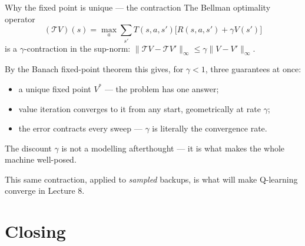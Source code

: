 \documentclass[10pt, aspectratio=169]{beamer}
\begin{document}
\begin{frame}{Why the fixed point is unique --- the contraction}
The Bellman optimality operator
\[
(\mathcal{T}V)(s) = \max_a \sum_{s'} T(s,a,s')\big[R(s,a,s') + \gamma V(s')\big]
\]
is a \alert{$\gamma$-contraction} in the sup-norm: $\|\mathcal{T}V - \mathcal{T}V'\|_\infty \le \gamma \|V - V'\|_\infty$.
\medskip

\pause
By the Banach fixed-point theorem this gives, for $\gamma<1$, three guarantees at once:
\begin{itemize}\setlength\itemsep{1pt}
\item a \alert{unique} fixed point $V^*$ --- the problem has one answer;
\item value iteration \alert{converges to it from any start}, geometrically at rate $\gamma$;
\item the error contracts every sweep --- $\gamma$ is literally the convergence rate.
\end{itemize}
\medskip

\pause
\begin{center}\large
The discount $\gamma$ is not a modelling afterthought --- it is what makes the whole machine \alert{well-posed}.
\end{center}
This same contraction, applied to \emph{sampled} backups, is what will make Q-learning converge in Lecture 8.
\end{frame}

\section{Closing}
\end{document}
